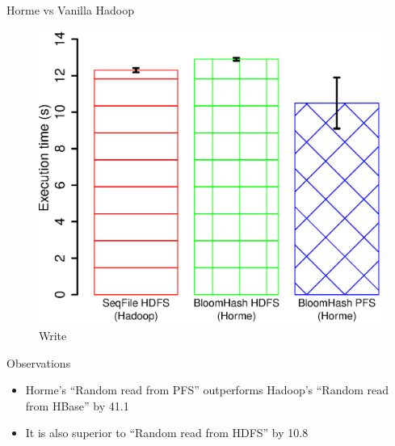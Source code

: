 \documentclass[newPxFont]{beamer}
\begin{document}
\begin{frame}[c]{Horme vs Vanilla Hadoop}
\begin{figure}[ht!]
      \includegraphics[scale=0.3]{eval-write}
      \centering
      \caption{Write}
    \end{figure}  
\end{frame}

\begin{frame}[c]{Observations}
  \begin{itemize}
    \item Horme’s “Random read from PFS” outperforms Hadoop’s “Random read from HBase” by 41.1%
    \item It is also superior to “Random read from HDFS” by 10.8%
  \end{itemize}
\end{frame}
\end{document}
